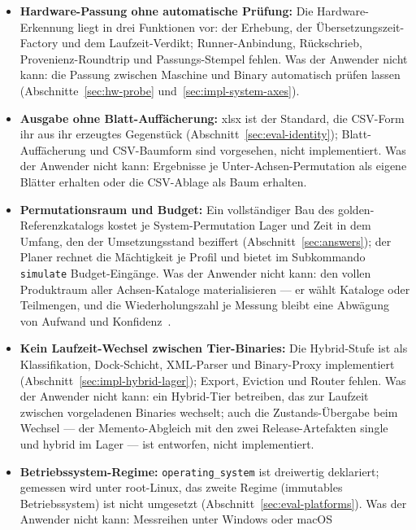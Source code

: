\begin{nurkurz}
\begin{itemize}
  deklariert, nicht erhoben; in der Smoke-Reihe sind die Hardware-Spalten n/a
  (Tabelle~\ref{tab:le:limitierung}, Zeile~1). Was der Anwender nicht kann: L2- und Kohärenz-Zähler auf
  anderen Modellen als Zen~5 erhalten (Abbildung~\ref{fig:measurement-triangle}).
  \item \textbf{Hardware-Passung ohne automatische Prüfung:} Die Hardware-Erkennung liegt in drei
  Funktionen vor: der Erhebung, der Übersetzungszeit-Factory und dem Laufzeit-Verdikt; Runner-Anbindung,
  Rückschrieb, Provenienz-Roundtrip und Passungs-Stempel fehlen. Was der Anwender nicht kann: die Passung
  zwischen Maschine und Binary
  automatisch prüfen lassen (Abschnitte~\ref{sec:hw-probe} und~\ref{sec:impl-system-axes}).
  \item \textbf{Ausgabe ohne Blatt-Auffächerung:} xlsx ist der Standard, die CSV-Form ihr aus ihr erzeugtes
  Gegenstück (Abschnitt~\ref{sec:eval-identity}); Blatt-Auffächerung und CSV-Baumform sind vorgesehen, nicht
  implementiert. Was der Anwender nicht kann: Ergebnisse je Unter-Achsen-Permutation als eigene Blätter
  erhalten oder die CSV-Ablage als Baum erhalten.
  \item \textbf{Permutationsraum und Budget:} Ein vollständiger Bau des golden-Referenzkatalogs kostet je
  System-Permutation Lager und Zeit in dem Umfang, den der Umsetzungsstand beziffert
  (Abschnitt~\ref{sec:answers}); der Planer rechnet die Mächtigkeit je Profil und bietet im Subkommando
  \texttt{simulate} Budget-Eingänge. Was der Anwender nicht kann: den
  vollen Produktraum aller Achsen-Kataloge materialisieren --- er wählt Kataloge oder Teilmengen, und die
  Wiederholungszahl je Messung bleibt eine Abwägung von Aufwand und Konfidenz~\cite{kalibera2013rigorous}.
  \item \textbf{Kein Laufzeit-Wechsel zwischen Tier-Binaries:} Die Hybrid-Stufe ist als Klassifikation,
  Dock-Schicht, XML-Parser und Binary-Proxy implementiert (Abschnitt~\ref{sec:impl-hybrid-lager}); Export,
  Eviction und Router fehlen. Was der Anwender nicht kann: ein Hybrid-Tier betreiben, das zur Laufzeit
  zwischen vorgeladenen Binaries wechselt; auch die Zustands-Übergabe beim Wechsel --- der Memento-Abgleich
  mit den zwei Release-Artefakten single und hybrid im Lager --- ist entworfen, nicht implementiert.
  \item \textbf{Betriebssystem-Regime:} \texttt{operating\_system} ist dreiwertig deklariert; gemessen wird
  unter root-Linux, das zweite Regime (immutables Betriebssystem) ist nicht umgesetzt
  (Abschnitt~\ref{sec:eval-platforms}). Was der Anwender nicht kann: Messreihen unter Windows oder macOS

\end{itemize}
\end{nurkurz}
